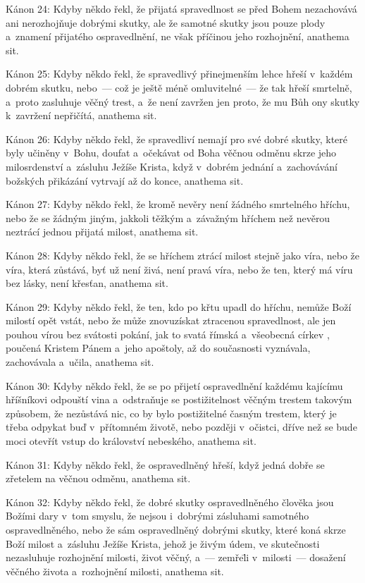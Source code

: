 \canon
Kánon 24: Kdyby někdo řekl, že přijatá spravedlnost se před Bohem nezachovává ani
nerozhojňuje dobrými skutky, ale že samotné skutky jsou pouze plody a~znamení přijatého
ospravedlnění, ne však příčinou jeho rozhojnění, anathema sit.

\canon
Kánon 25: Kdyby někdo řekl, že spravedlivý přinejmenším lehce hřeší v~každém dobrém
skutku, nebo~— což je ještě méně omluvitelné~— že tak hřeší smrtelně, a~proto zasluhuje
věčný trest, a~že není zavržen jen proto, že mu Bůh ony skutky k~zavržení nepřičítá,
anathema sit.

\canon
Kánon 26: Kdyby někdo řekl, že spravedliví nemají pro své dobré skutky, které byly
učiněny v~Bohu, doufat a~očekávat od Boha věčnou odměnu skrze jeho milosrdenství
a~zásluhu Ježíše Krista, když v~dobrém jednání a~zachovávání božských přikázání vytrvají
až do konce, anathema sit.

\canon
Kánon 27: Kdyby někdo řekl, že kromě nevěry není žádného smrtelného hříchu, nebo
že se žádným jiným, jakkoli těžkým a~závažným hříchem než nevěrou neztrácí jednou
přijatá milost, anathema sit.

\canon
Kánon 28: Kdyby někdo řekl, že se hříchem ztrácí milost stejně jako víra, nebo že
víra, která zůstává, byť už není živá, není pravá víra, nebo že ten, který má víru
bez lásky, není křesťan, anathema sit.

\canon
Kánon 29: Kdyby někdo řekl, že ten, kdo po křtu upadl do hříchu, nemůže Boží milostí
opět vstát, nebo že může znovuzískat ztracenou spravedlnost, ale jen pouhou vírou
bez svátosti pokání, jak to svatá římská a~všeobecná církev , poučená Kristem Pánem
a~jeho apoštoly, až do současnosti vyznávala, zachovávala a~učila, anathema sit.

\canon
Kánon 30: Kdyby někdo řekl, že se po přijetí ospravedlnění každému kajícímu hříšníkovi
odpouští vina a~odstraňuje se postižitelnost věčným trestem takovým způsobem, že
nezůstává nic, co by bylo postižitelné časným trestem, který je třeba odpykat buď
v~přítomném životě, nebo později v~očistci, dříve než se bude moci otevřít vstup
do království nebeského, anathema sit.

\canon
Kánon 31: Kdyby někdo řekl, že ospravedlněný hřeší, když jedná dobře se zřetelem
na věčnou odměnu, anathema sit.

\canon
Kánon 32: Kdyby někdo řekl, že dobré skutky ospravedlněného člověka jsou Božími dary
v~tom smyslu, že nejsou i~dobrými zásluhami samotného ospravedlněného, nebo že sám
ospravedlněný dobrými skutky, které koná skrze Boží milost a~zásluhu Ježíše Krista,
jehož je živým údem, ve skutečnosti nezasluhuje rozhojnění milosti, život věčný,
a~— zemře\=li v~milosti~— dosažení věčného života a~rozhojnění milosti, anathema sit.

